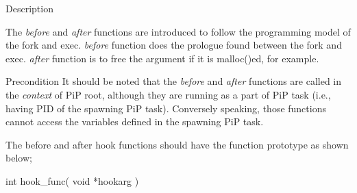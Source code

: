 \begin{DoxyParagraph}{Description}

\end{DoxyParagraph}
The {\itshape before} and {\itshape after} functions are introduced to follow the programming model of the {\ttfamily fork} and {\ttfamily exec}. {\itshape before} function does the prologue found between the {\ttfamily fork} and {\ttfamily exec}. {\itshape after} function is to free the argument if it is {\ttfamily malloc()ed}, for example. \begin{DoxyPrecond}{Precondition}
It should be noted that the {\itshape before} and {\itshape after} functions are called in the {\itshape context} of Pi\-P root, although they are running as a part of Pi\-P task (i.\-e., having P\-I\-D of the spawning Pi\-P task). Conversely speaking, those functions cannot access the variables defined in the spawning Pi\-P task. 

The before and after hook functions should have the function prototype as shown below; 
\begin{DoxyCode}
\textcolor{keywordtype}{int} hook\_func( \textcolor{keywordtype}{void} *hookarg )
\end{DoxyCode}

\end{DoxyPrecond}

